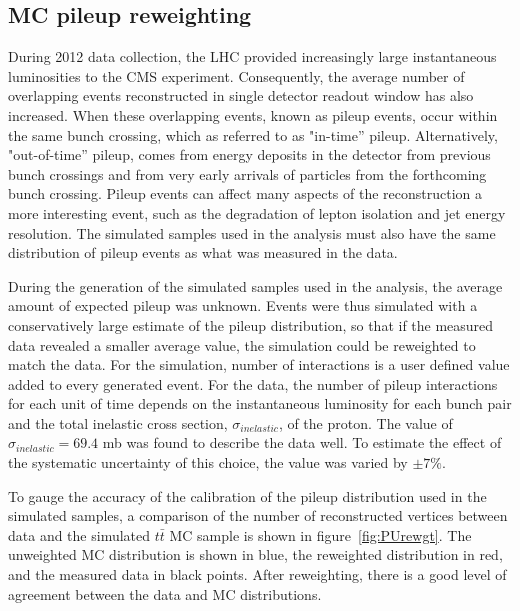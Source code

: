 \subsection{MC pileup reweighting}
\label{mc_pileup_reweight_overview}

\par During 2012 data collection, the LHC provided increasingly
large instantaneous luminosities to the CMS experiment.  Consequently,
the average number of overlapping events reconstructed in single
detector readout window has also increased.  When these overlapping
events, known as pileup events, occur within the same bunch crossing,
which as referred to as "in-time'' pileup.  Alternatively,
"out-of-time'' pileup, comes from energy deposits in the detector from
previous bunch crossings and from very early arrivals of particles
from the forthcoming bunch crossing.  Pileup events can affect many
aspects of the reconstruction a more interesting event, such as the
degradation of lepton isolation and jet energy resolution.  The
simulated samples used in the analysis must also have the same
distribution of pileup events as what was measured in the data.

\par During the generation of the simulated samples used in the
analysis, the average amount of expected pileup was unknown.  Events
were thus simulated with a conservatively large estimate of the pileup
distribution, so that if the measured data revealed a smaller average
value, the simulation could be reweighted to match the data.  
For the simulation, number of interactions is a user defined value
added to every generated event.  For the data, the number of pileup
interactions for each unit of time depends on the instantaneous luminosity for each bunch pair and the
total inelastic cross section, $\sigma_{inelastic}$, of the proton.
The value of $\sigma_{inelastic} = 69.4$ mb was found to describe the data
well.  To estimate the effect of the systematic uncertainty of this
choice, the value was varied by $\pm 7\%$.  

\par To gauge the accuracy of the calibration of the pileup
distribution used in the simulated samples, a comparison of the
number of reconstructed vertices between data and the simulated
$t\bar{t}$ MC sample is shown in figure~\ref{fig:PUrewgt}.  The
unweighted MC distribution is shown in blue, the reweighted
distribution in red, and the measured data in black points.  After
reweighting, there is a good level of agreement between the data and
MC distributions.  

